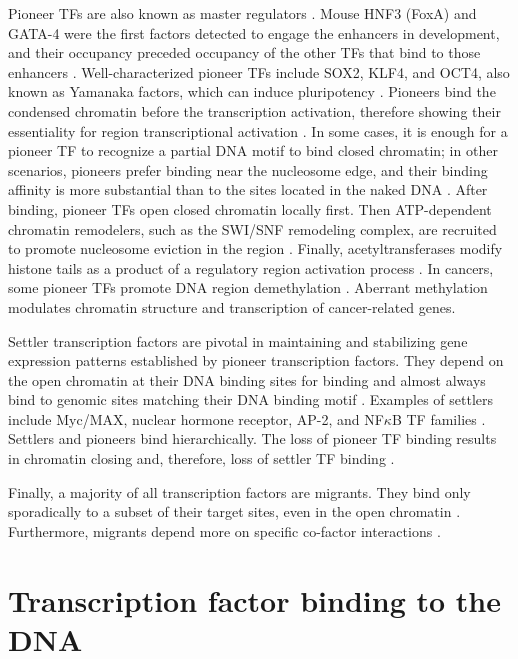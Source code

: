     Pioneer TFs are also known as master regulators \cite{long2016ever}. Mouse HNF3 (FoxA) and GATA-4 were the first factors detected to engage the enhancers in development, and their occupancy preceded occupancy of the other TFs that bind to those enhancers \cite{zaret2011pioneer,cirillo2002opening,yu2020pioneer}. Well-characterized pioneer TFs include SOX2, KLF4, and OCT4, also known as Yamanaka factors, which can induce pluripotency \cite{yu2020pioneer}. Pioneers bind the condensed chromatin before the transcription activation, therefore showing their essentiality for region transcriptional activation \cite{yu2020pioneer}. In some cases, it is enough for a pioneer TF to recognize a partial DNA motif to bind closed chromatin; in other scenarios, pioneers prefer binding near the nucleosome edge, and their binding affinity is more substantial than to the sites located in the naked DNA \cite{yu2020pioneer}. After binding, pioneer TFs open closed chromatin locally first. Then ATP-dependent chromatin remodelers, such as the SWI/SNF remodeling complex, are recruited to promote nucleosome eviction in the region \cite{barral2023pioneer}. Finally, acetyltransferases modify histone tails as a product of a regulatory region activation process \cite{barral2023pioneer,boeva2016analysis}. In cancers, some pioneer TFs promote DNA region demethylation \cite{lemma2022pioneer}. Aberrant methylation modulates chromatin structure and transcription of cancer-related genes.

    Settler transcription factors are pivotal in maintaining and stabilizing gene expression patterns established by pioneer transcription factors. They depend on the open chromatin at their DNA binding sites for binding and almost always bind to genomic sites matching their DNA binding motif \cite{sherwood2014discovery,ehsani2016feature}. Examples of settlers include Myc/MAX, nuclear hormone receptor, AP-2, and NF\( \kappa \)B TF families \cite{sherwood2014discovery}. Settlers and pioneers bind hierarchically. The loss of pioneer TF binding results in chromatin closing and, therefore, loss of settler TF binding \cite{sherwood2014discovery}.

    Finally, a majority of all transcription factors are migrants. They bind only sporadically to a subset of their target sites, even in the open chromatin \cite{sherwood2014discovery,ehsani2016feature}. Furthermore, migrants depend more on specific co-factor interactions \cite{sherwood2014discovery}.

  \section{Transcription factor binding to the DNA}


